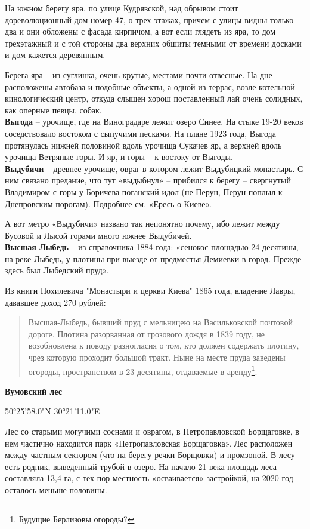 На южном берегу яра, по улице Кудрявской, над обрывом стоит дореволюционный дом номер 47, о трех этажах, причем с улицы видны только два и они обложены с фасада кирпичом, а вот если глядеть из яра, то дом трехэтажный и с той стороны два верхних обшиты темными от времени досками и дом кажется деревянным.

Берега яра – из суглинка, очень крутые, местами почти отвесные. На дне расположены автобаза и подобные объекты, а одной из террас, возле котельной – кинологический центр, откуда слышен хорош поставленный лай очень солидных, как оперные певцы, собак.\\

\textbf{Выгода} – урочище, где на Виноградаре лежит озеро Синее. На стыке 19-20 веков соседствовало востоком с сыпучими песками. На плане 1923 года, Выгода протянулась нижней половиной вдоль урочища Сукачев яр, а верхней вдоль урочища Ветряные горы. И яр, и горы – к востоку от Выгоды.\\ 

\textbf{Выдубичи} – древнее урочище, овраг в котором лежит Выдубицкий монастырь. С ним связано предание, что тут «выдыбнул» – прибился к берегу – свергнутый Владимиром с горы у Боричева поганский идол (не Перун, Перун поплыл к Днепровским порогам). Подробнее см. «Ересь о Киеве».

А вот метро «Выдубичи» названо так непонятно почему, ибо лежит между Бусовой и Лысой горами много южнее Выдубичей.\\

\textbf{Высшая Лыбедь} – из справочника 1884 года: «сенокос площадью 24 десятины, на реке Лыбедь, у плотины при выезде от предместья Демиевки в город. Прежде здесь был Лыбедский пруд».

Из книги Похилевича "Монастыри и церкви Киева" 1865 года, владение Лавры, дававшее доход 270 рублей:

\begin{quotation}
Высшая-Лыбедь, бывший пруд с мельницею на Васильковской почтовой дороге. Плотина разорванная от грозового дождя в 1839 году, не возобновлена к поводу разногласия о том, кто должен содержать плотину, чрез которую проходит большой тракт. Ныне на месте пруда заведены огороды, пространством в 23 десятины, отдаваемые в аренду\footnote{Будущие Берлизовы огороды?}. 
\end{quotation}

\textbf{Вумовский лес}

50°25'58.0"N 30°21'11.0"E

Лес со старыми могучими соснами и оврагом, в Петропавловской Борщаговке, в нем частично находится парк «Петропавловская Борщаговка». Лес расположен между частным сектором (что на берегу речки Борщовки) и промзоной. В лесу есть родник, выведенный трубой в озеро. На начало 21 века площадь леса составляла 13,4 га, с тех пор местность «осваивается» застройкой, на 2020 год осталось меньше половины.

